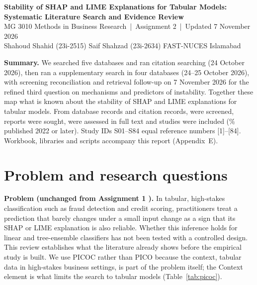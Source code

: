 


\nocite{S01,S02,S03,S04,S05,S06,S07,S08,S09,S10,S11,S12,S13,S14,S15,S16,S17,S18,S19,S20,S21,S22,S23,S24,S25,S26,S27,S28,S29,S30,S31,S32,S33,S34,S35,S36,S37,S38,S39,S40,S41,S42,S43,S44,S45,S46,S47,S48,S49,S50,S51,S52,S53,S54,S55,S56,S57,S58,S59,S60,S61,S62,S63,S64,S65,S66,S67,S68,S69,S70,S71,S72,S73,S74,S75,S76,S77,S78,S79,S80,S81,S82,S83,S84}

\begin{center}
{\Large\bfseries\color{navy} Stability of SHAP and LIME Explanations for Tabular Models:\\[2pt] Systematic Literature Search and Evidence Review}\\[6pt]
{\small MG 3010 Methods in Business Research \,|\, Assignment 2 \,|\, Updated 7 November 2026}\\[3pt]
{\small Shahoud Shahid (23i-2515) \quad Saif Shahzad (23i-2634) \quad FAST-NUCES Islamabad}
\end{center}
\vspace{-4pt}
{\small\noindent\textbf{Summary.} We searched five databases and ran citation searching (24 October 2026), then ran a supplementary search in four databases (24--25 October 2026), with screening reconciliation and retrieval follow-up on 7 November 2026 for the refined third question on mechanisms and predictors of instability. Together these map what is known about the stability of SHAP and LIME explanations for tabular models. From \dbAllId{} database records and \csHarvested{} citation records, \totalScreened{} were screened, \totalSought{} reports were sought, \totalAssessed{} were assessed in full text and \totalIncluded{} studies were included (\pctSinceTwentyTwo\% published 2022 or later). Study IDs S01--S84 equal reference numbers [1]--[84]. Workbook, libraries and scripts accompany this report (Appendix~E).}

\section{Problem and research questions}
\textbf{Problem (unchanged from Assignment 1 \cite{a1proposal}).} In tabular, high-stakes classification such as fraud detection and credit scoring, practitioners treat a prediction that barely changes under a small input change as a sign that its SHAP \cite{lundberg2017} or LIME \cite{ribeiro2016} explanation is also reliable. Whether this inference holds for linear and tree-ensemble classifiers has not been tested with a controlled design. This review establishes what the literature already shows before the empirical study is built. We use PICOC rather than PICO because the context, tabular data in high-stakes business settings, is part of the problem itself; the Context element is what limits the search to tabular models (Table~\ref{tab:picoc}).

